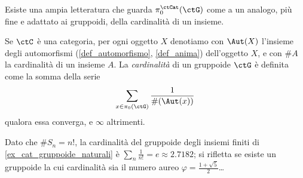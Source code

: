 Esiste una ampia letteratura che guarda \(\pi_0^\ctCat(\ctG)\) come a un analogo, più fine e adattato ai gruppoidi, della cardinalità di un insieme.
\begin{definition}
	Se \(\ctC\) è una categoria, per ogni oggetto \(X\) denotiamo con \(\Aut(X)\) l'insieme degli automorfismi (\ref{def_automorfismo}, \ref{def_anima}) dell'oggetto \(X\), e con \(\# A\) la cardinalità di un insieme \(A\). La \emph{cardinalità} di un gruppoide \(\ctG\) è definita come la somma della serie
	\[\sum_{x\in \pi_0(\ctG)} \frac 1{\#(\Aut(x))}\]
	qualora essa converga, e \(\infty\) altrimenti.
\end{definition}
Dato che \(\# S_n = n!\), la cardinalità del gruppoide degli insiemi finiti di \ref{ex_cat_gruppoide_naturali} è \(\sum_n \frac 1{n!} = e \approx 2.7182\); si rifletta se esiste un gruppoide la cui cardinalità sia il numero aureo \(\varphi = \frac{1+\sqrt 5}{2}\)\dots
